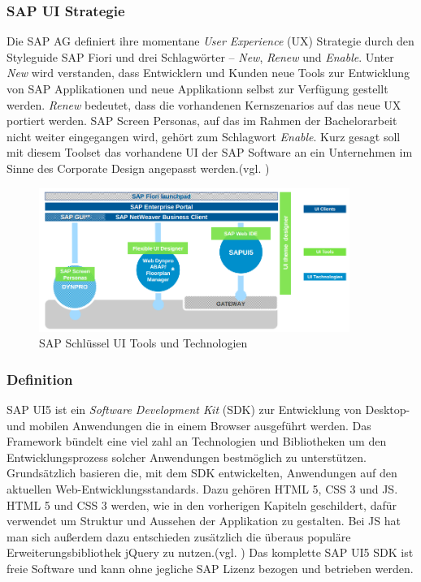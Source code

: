 \subsubsection{SAP UI Strategie}
Die SAP AG definiert ihre momentane \textit{User Experience} (UX) Strategie durch den Styleguide SAP Fiori und drei Schlagwörter -- \textit{New}, \textit{Renew} und \textit{Enable}. Unter \textit{New} wird verstanden, dass Entwicklern und Kunden neue Tools zur Entwicklung von SAP Applikationen und neue Applikationn selbst zur Verfügung gestellt werden. \textit{Renew} bedeutet, dass die vorhandenen Kernszenarios auf das neue UX portiert werden. SAP Screen Personas, auf das im Rahmen der Bachelorarbeit nicht weiter eingegangen wird, gehört zum Schlagwort \textit{Enable}. Kurz gesagt soll mit diesem Toolset das vorhandene UI der SAP Software an ein Unternehmen im Sinne des Corporate Design angepasst werden.(vgl. \cite{SAPUX})

\vspace{1em}
\begin{figure}[htb]
  \centering
  \includegraphics[width=0.9\textwidth]{abb/sap_key_ui_tools}
  \caption[SAP Schlüssel UI Tools und Technologien]{SAP Schlüssel UI Tools und Technologien \cite{SAPUXPDF}}
  \label{fig:sapkeyuitools}
\end{figure}

\subsubsection{Definition}
SAP UI5 ist ein \textit{Software Development Kit} (SDK) zur Entwicklung von Desktop- und mobilen Anwendungen die in einem Browser ausgeführt werden. Das Framework bündelt eine viel zahl an Technologien und Bibliotheken um den Entwicklungsprozess solcher Anwendungen bestmöglich zu unterstützen. Grundsätzlich basieren die, mit dem SDK entwickelten, Anwendungen auf den aktuellen Web-Entwicklungsstandards. Dazu gehören HTML 5, CSS 3 und JS. HTML 5 und CSS 3 werden, wie in den vorherigen Kapiteln geschildert, dafür verwendet um Struktur und Aussehen der Applikation zu gestalten. Bei JS hat man sich außerdem dazu entschieden zusätzlich die überaus populäre Erweiterungsbibliothek jQuery zu nutzen.(vgl. \cite{BuiltWith2014}) Das komplette SAP UI5 SDK ist freie Software und kann ohne jegliche SAP Lizenz bezogen und betrieben werden.

